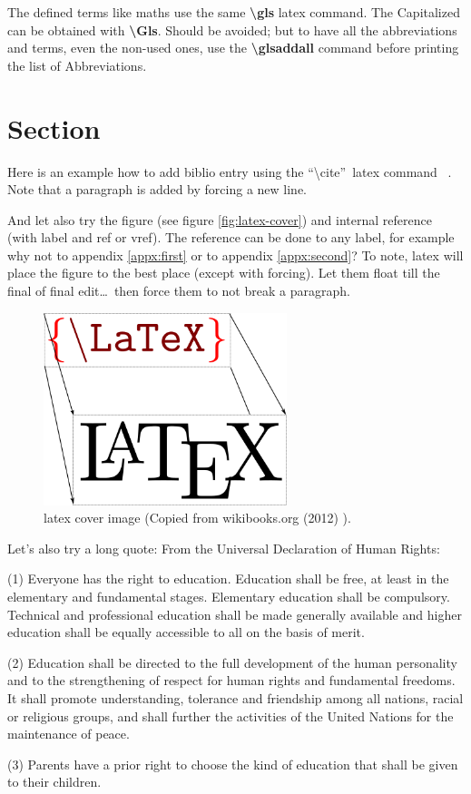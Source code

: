 \documentclass[11pt,a4paper,oneside,article]{memoir}
\renewenvironment{quote}
  {\list{}{\rightmargin=0pt\leftmargin=1cm\topsep=-10pt}%
  \item\relax\fontsize{10pt}{10pt}\singlespacing}
  {\endlist}
\begin{document}
The defined terms like \gls{maths} use the same \textbf{\textbackslash{}gls} \gls{latex} command. The Capitalized can be obtained with \textbf{\textbackslash{}Gls}. Should be avoided; but to have all the abbreviations and terms, even the non-used ones, use the \textbf{\textbackslash{}glsaddall} command before printing the list of Abbreviations. 

\section{Section}
Here is an example how to add biblio entry \cite{kopka:guide} using the \textquotedblleft\textbackslash{}cite\textquotedblright ~\gls{latex} command ~\cite[section 4.2]{tobias:book}. Note that a paragraph is added by forcing a new line.

And let also try the figure (see figure \vref{fig:latex-cover}) and internal reference (with label and ref or vref). The reference can be done to any label, for example why not to appendix \ref{appx:first} or to appendix \ref{appx:second}? To note, \gls{latex} will place the figure to the best place (except with forcing). Let them float till the final of final edit\ldots ~then force them to not break a paragraph.%
\begin{figure}[h]
  \centering
  \includegraphics[width=7.1cm]{LaTeX_cover}
  \caption{\gls{latex} cover image (Copied from wikibooks.org (2012) \cite{wikibooks:latex}).}
  \label{fig:latex-cover}
\end{figure}

Let's also try a long quote:
From the Universal Declaration of Human Rights:
\begin{quote}
(1) Everyone has the right to education. Education shall be free, at least in the elementary and fundamental stages. Elementary education shall be compulsory. Technical and professional education shall be made generally available and higher education shall be equally accessible to all on the basis of merit.

(2) Education shall be directed to the full development of the human personality and to the strengthening of respect for human rights and fundamental freedoms. It shall promote understanding, tolerance and friendship among all nations, racial or religious groups, and shall further the activities of the United Nations for the maintenance of peace.

(3) Parents have a prior right to choose the kind of education that shall be given to their children. \cite[article 26]{un:udhr}
\end{quote}
\end{document}

